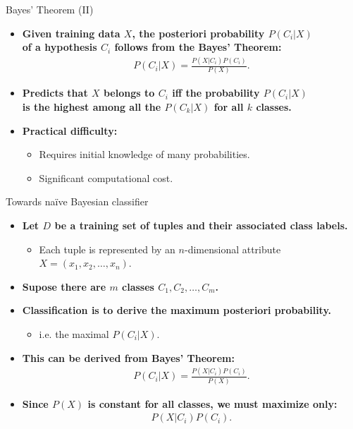 \documentclass[aspectratio=169,t,table]{beamer}
\begin{document}
  {
    \begin{frame}{Bayes' Theorem (II)}
        \begin{itemize}
          \item \textbf{Given training data $X$, the posteriori probability $P(C_i|X)$\\
           of a hypothesis $C_i$ follows from the Bayes' Theorem:}
           \begin{align}
             P(C_i|X) = \frac{P(X|C_i)P(C_i)}{P(X)}.
           \end{align}
          \item \textbf{Predicts that $X$ belongs to $C_i$ iff the probability $P(C_i|X)$\\
           is {\color{airforceblue}the highest} among all the $P(C_k|X)$ for all $k$ classes.}
           \item \textbf{Practical difficulty:}
           \begin{itemize}
             \item Requires initial knowledge of many probabilities.
             \item Significant computational cost.
           \end{itemize}
        \end{itemize}
    \end{frame}
  }

  {
    \begin{frame}{Towards naïve Bayesian classifier}
        \begin{itemize}
          \item \textbf{Let $D$ be a training set of tuples and their associated class labels.}
          \begin{itemize}
            \item Each tuple is represented by an $n$-dimensional attribute $X = (x_1,x_2,\ldots,x_n)$.
          \end{itemize}
          \item \textbf{Supose there are $m$ classes $C_1,C_2, \ldots, C_m$.}
          \item \textbf{Classification is to derive the {\color{airforceblue}maximum posteriori probability}.}
          \begin{itemize}
            \item i.e. the maximal $P(C_i|X)$.
          \end{itemize}
          \item \textbf{This can be derived from Bayes' Theorem:}
          \begin{align}
            P(C_i|X) = \frac{P(X|C_i)P(C_i)}{P(X)}.
          \end{align}
          \item \textbf{Since $P(X)$ is constant for all classes, we must maximize only:}
          \begin{align}
            P(X|C_i)P(C_i).
          \end{align}
        \end{itemize}
    \end{frame}
  }
\end{document}
